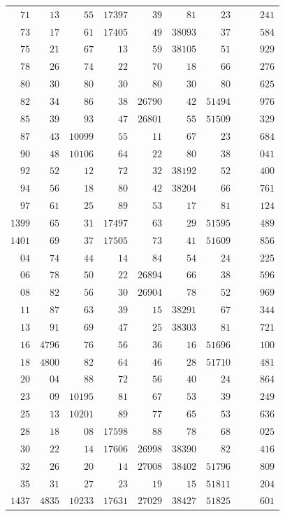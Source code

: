 \begin{longtable}{@{}r|r|r|r|r|r|r|r|r|r@{}}
$71$ & $13$ & $55$ & $17397$ & $39$ & $81$ & $23$ &  &  & $241$\\
$73$ & $17$ & $61$ & $17405$ & $49$ & $38093$ & $37$ &  &  & $584$\\
$75$ & $21$ & $67$ & $13$ & $59$ & $38105$ & $51$ &  &  & $929$\\
$78$ & $26$ & $74$ & $22$ & $70$ & $18$ & $66$ &  &  & $276$\\
$80$ & $30$ & $80$ & $30$ & $80$ & $30$ & $80$ &  &  & $625$\\
$82$ & $34$ & $86$ & $38$ & $26790$ & $42$ & $51494$ &  &  & $976$\\
$85$ & $39$ & $93$ & $47$ & $26801$ & $55$ & $51509$ &  &  & $329$\\
$87$ & $43$ & $10099$ & $55$ & $11$ & $67$ & $23$ &  &  & $684$\\
$90$ & $48$ & $10106$ & $64$ & $22$ & $80$ & $38$ &  &  & $041$\\
$92$ & $52$ & $12$ & $72$ & $32$ & $38192$ & $52$ &  &  & $400$\\
$94$ & $56$ & $18$ & $80$ & $42$ & $38204$ & $66$ &  &  & $761$\\
$97$ & $61$ & $25$ & $89$ & $53$ & $17$ & $81$ &  &  & $124$\\
$1399$ & $65$ & $31$ & $17497$ & $63$ & $29$ & $51595$ &  &  & $489$\\
$1401$ & $69$ & $37$ & $17505$ & $73$ & $41$ & $51609$ &  &  & $856$\\
$04$ & $74$ & $44$ & $14$ & $84$ & $54$ & $24$ &  &  & $225$\\
$06$ & $78$ & $50$ & $22$ & $26894$ & $66$ & $38$ &  &  & $596$\\
$08$ & $82$ & $56$ & $30$ & $26904$ & $78$ & $52$ &  &  & $969$\\
$11$ & $87$ & $63$ & $39$ & $15$ & $38291$ & $67$ &  &  & $344$\\
$13$ & $91$ & $69$ & $47$ & $25$ & $38303$ & $81$ &  &  & $721$\\
$16$ & $4796$ & $76$ & $56$ & $36$ & $16$ & $51696$ &  &  & $100$\\
$18$ & $4800$ & $82$ & $64$ & $46$ & $28$ & $51710$ &  &  & $481$\\
$20$ & $04$ & $88$ & $72$ & $56$ & $40$ & $24$ &  &  & $864$\\
$23$ & $09$ & $10195$ & $81$ & $67$ & $53$ & $39$ &  &  & $249$\\
$25$ & $13$ & $10201$ & $89$ & $77$ & $65$ & $53$ &  &  & $636$\\
$28$ & $18$ & $08$ & $17598$ & $88$ & $78$ & $68$ &  &  & $025$\\
$30$ & $22$ & $14$ & $17606$ & $26998$ & $38390$ & $82$ &  &  & $416$\\
$32$ & $26$ & $20$ & $14$ & $27008$ & $38402$ & $51796$ &  &  & $809$\\
$35$ & $31$ & $27$ & $23$ & $19$ & $15$ & $51811$ &  &  & $204$\\
$1437$ & $4835$ & $10233$ & $17631$ & $27029$ & $38427$ & $51825$ &  &  & $601$\\
\hline\end{longtable}\endgroup

